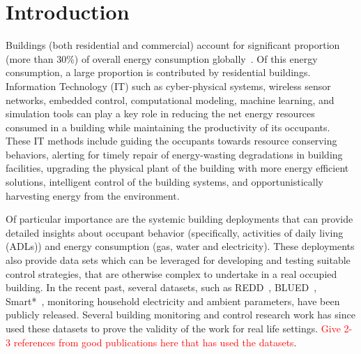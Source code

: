 \documentclass[10pt]{sensys-proc}
\newcommand{\redcolor}[1]{\textcolor{red}{#1}}
\begin{document}
\section{Introduction}
\label{sec:intro}
Buildings (both residential and commercial) account for significant proportion (more than 30\%) of overall energy consumption globally~\cite{evans09india}. %
Of this energy consumption, a large proportion is contributed by residential buildings. %
Information Technology (IT) such as cyber-physical systems, wireless sensor networks, embedded control, computational modeling, machine learning, and simulation tools can play a key role in reducing the net energy resources consumed in a building while maintaining the productivity of its occupants. These IT methods include guiding the occupants towards resource conserving behaviors, alerting for timely repair of energy-wasting degradations in building facilities, upgrading the physical plant of the building with more energy efficient solutions, intelligent control of the building systems, and opportunistically harvesting energy from the environment.
 
Of particular importance are the systemic building deployments that can provide detailed insights about occupant behavior (specifically, activities of daily living (ADLs)) and energy consumption (gas, water and electricity). These deployments also provide data sets which can be leveraged for developing and testing suitable control strategies, that are otherwise complex to undertake in a real occupied building. In the recent past, several datasets, such as REDD~\cite{redd}, BLUED~\cite{blued_cmu}, Smart*~\cite{smart}, monitoring household electricity and ambient parameters, have been publicly released. Several building monitoring and control research work has since used these datasets to prove the validity of the work for real life settings. \redcolor{Give 2-3 references from good publications here that has used the datasets}. 
\end{document}

